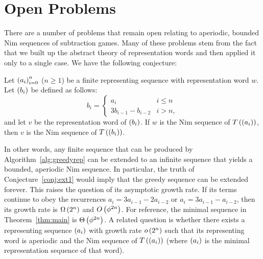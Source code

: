 \documentclass[english,12pt]{article}
\newcommand{\seq}{\p}
\begin{document}
\section{Open Problems}\label{s:open}
There are a number of problems that remain open relating to aperiodic, bounded Nim sequences of subtraction games.  Many of these problems stem from the fact that we built up the abstract theory of representation words and then applied it only to a single case.  We have the following conjecture:
\begin{conj}\label{conj:ext1}
Let $\seq{a_i}_{i=0}^n$ ($n\geq1$) be a finite representing sequence with representation word $w$.  Let $\seq{b_i}$ be defined as follows:
\[
b_i=\begin{cases}
a_i & i\leq n\\
3b_{i-1}-b_{i-2} & i>n,
\end{cases}
\]
and let $v$ be the representation word of $\seq{b_i}$.  If $w$ is the Nim sequence of $T\p{\seq{a_i}}$, then $v$ is the Nim sequence of $T\p{\seq{b_i}}$.
\end{conj}
In other words, any finite sequence that can be produced by Algorithm~\ref{alg:greedyrep} can be extended to an infinite sequence that yields a bounded, aperiodic Nim sequence.  In particular, the truth of Conjecture~\ref{conj:ext1} would imply that the greedy sequence can be extended forever.  This raises the question of its asymptotic growth rate.  If its terms continue to obey the recurrences $a_i=3a_{i-1}-2a_{i-2}$ or $a_i=3a_{i-1}-a_{i-2}$, then its growth rate is $\Omega\left(2^n\right)$ and $O\left(\phi^{2n}\right)$.  For reference, the minimal sequence in Theorem~\ref{thm:main} is $\Theta\left(\phi^{2n}\right)$.  A related question is whether there exists a representing sequence $\seq{a_i}$ with growth rate $o\left(2^n\right)$ such that its representing word is aperiodic and the Nim sequence of $T\p{\seq{a_i}}$ (where $\seq{a_i}$ is the minimal representation sequence of that word).
\end{document}
